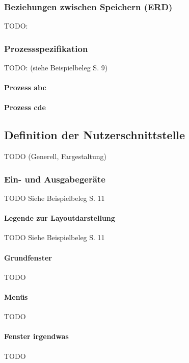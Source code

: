 \subsubsection{Beziehungen zwischen Speichern (ERD)}
TODO:

\subsubsection{Prozessspezifikation}
TODO: (siehe Beispielbeleg S. 9)

\paragraph{Prozess abc}

\paragraph{Prozess cde}

\subsection{Definition der Nutzerschnittstelle}
TODO (Generell, Fargestaltung)

\subsubsection{Ein- und Ausgabegeräte}
TODO Siehe Beispielbeleg S. 11

\paragraph{Legende zur Layoutdarstellung}
TODO Siehe Beispielbeleg S. 11

\paragraph{Grundfenster}
TODO

\paragraph{Menüs}
TODO

\paragraph{Fenster irgendwas}
TODO
